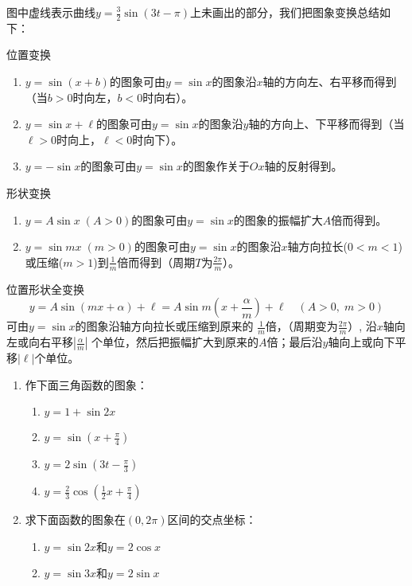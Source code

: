图中虚线表示曲线$y=\frac{3}{2}\sin(3t-\pi)$上未画出的部分，我们把图象变换总结如下：

\begin{blk}{位置变换}
\begin{enumerate}
    \item $y=\sin(x+b)$的图象可由$y=\sin x$的图象沿$x$轴的方向左、右平移而得到（当$b>0$时向左，$b<0$时向右）。
    \item $y=\sin x+\ell$的图象可由$y=\sin x$的图象沿$y$轴的方向上、下平移而得到（当$\ell>0$时向上，$\ell<0$时向下）。
    \item $y=-\sin x$的图象可由$y=\sin x$的图象作关于$Ox$轴的反射得到。
\end{enumerate}
\end{blk}

\begin{blk}{形状变换}
    \begin{enumerate}
        \item $y=A\sin x\; (A>0)$的图象可由$y=\sin x$的图象的振幅扩大$A$倍而得到。
\item $y=\sin mx\; (m>0)$的图象可由$y=\sin x$的图象沿$x$轴方向拉长($0<m<1$)或压缩($m>1$)到$\frac{1}{m}$倍而得到（周期$T$为$\frac{2\pi}{m}$）。
    \end{enumerate}
\end{blk}


\begin{blk}{位置形状全变换}
\[y=A\sin(mx+\alpha)+\ell=A\sin m\left(x+\frac{\alpha}{m}\right) +\ell\quad  (A> 0,\; m>0)\]
可由$y=\sin x$的图象沿轴方向拉长或压缩到原来的
$\frac{1}{m}$倍，（周期变为$\frac{2\pi}{m}$）, 沿$x$轴向左或向右平移$\left|\frac{\alpha}{m}\right|$
个单位，然后把振幅扩大到原来的$A$倍；最后沿$y$轴向上或向下平移$|\ell|$个单位。
\end{blk}

\begin{ex}
\begin{enumerate}
    \item 作下面三角函数的图象：
    \begin{multicols}{2}
\begin{enumerate}
    \item $y=1+\sin2x$
    \item $y=\sin\left(x+\frac{\pi}{4}\right) $
    \item $y=2\sin\left(3t-\frac{\pi}{3}\right)$
    \item $y=\frac{2}{3}\cos\left(\frac{1}{2}x+\frac{\pi}{4}\right)$
\end{enumerate}
    \end{multicols}
    \item 求下面函数的图象在$(0, 2\pi)$区间的交点坐标：
    \begin{enumerate}
        \item $y=\sin 2x$和$y=2\cos x$
        \item $y=\sin 3x$和$y=2\sin x$
    \end{enumerate}
\end{enumerate}
\end{ex}

